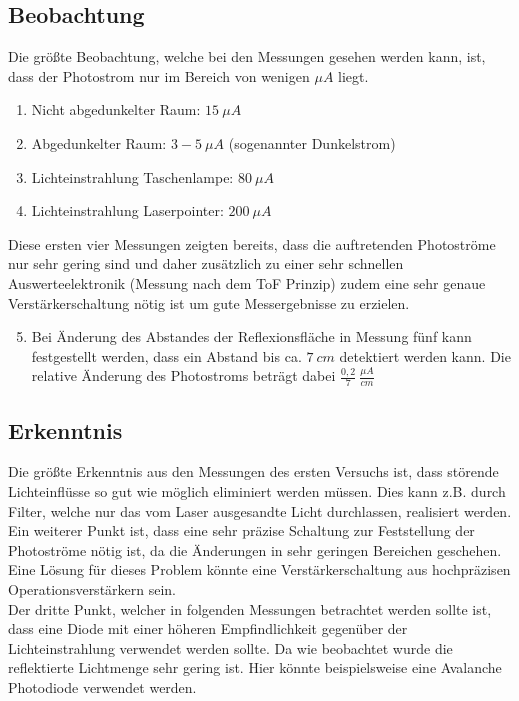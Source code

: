 \subsection{Beobachtung}
Die größte Beobachtung, welche bei den Messungen gesehen werden kann, ist, dass der Photostrom nur im Bereich von wenigen $\mu A$ liegt.
\begin{enumerate}
	\item Nicht abgedunkelter Raum: $15\:\mu A$ 
	\item Abgedunkelter Raum: $3-5\:\mu A$  (sogenannter Dunkelstrom)
	\item Lichteinstrahlung Taschenlampe: $80\:\mu A$ 
	\item Lichteinstrahlung Laserpointer: $200\:\mu A$
\end{enumerate}
Diese ersten vier Messungen zeigten bereits, dass die auftretenden Photoströme nur sehr gering sind und daher zusätzlich zu einer sehr schnellen Auswerteelektronik (Messung nach dem \ac{ToF} Prinzip) zudem eine sehr genaue Verstärkerschaltung nötig ist um gute Messergebnisse zu erzielen.
\begin{enumerate}
	\setcounter{enumi}{4}
	\item Bei Änderung des Abstandes der Reflexionsfläche in Messung fünf kann festgestellt werden, dass ein Abstand bis ca. $7\:cm$ detektiert werden kann. Die relative Änderung des Photostroms beträgt dabei $\frac{0,2}{7}\:\frac{\mu A}{cm}$
\end{enumerate}
\subsection{Erkenntnis}
Die größte Erkenntnis aus den Messungen des ersten Versuchs ist, dass störende Lichteinflüsse so gut wie möglich eliminiert werden müssen. Dies kann z.B. durch Filter, welche nur das vom Laser ausgesandte Licht durchlassen, realisiert werden.\\
Ein weiterer Punkt ist, dass eine sehr präzise Schaltung zur Feststellung der Photoströme nötig ist, da die Änderungen in sehr geringen Bereichen geschehen. Eine Lösung für dieses Problem könnte eine Verstärkerschaltung aus hochpräzisen Operationsverstärkern sein.\\
Der dritte Punkt, welcher in folgenden Messungen betrachtet werden sollte ist, dass eine Diode mit einer höheren Empfindlichkeit gegenüber der Lichteinstrahlung verwendet werden sollte. Da wie beobachtet wurde die reflektierte Lichtmenge sehr gering ist. Hier könnte beispielsweise eine Avalanche Photodiode verwendet werden.

